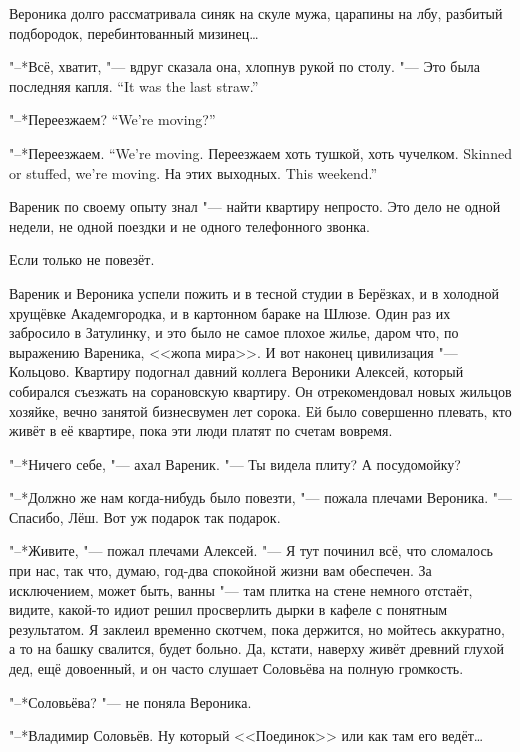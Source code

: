 Вероника долго рассматривала синяк на скуле мужа, царапины на лбу, разбитый подбородок, перебинтованный мизинец\dots{}

"--*Всё, хватит, "--- вдруг сказала она, хлопнув рукой по столу.
{"--- Это была последняя капля.}
{``It was the last straw.''}

{"--*Переезжаем?}
{``We're moving?''}

{"--*Переезжаем.}
{``We're moving.}
{Переезжаем хоть тушкой, хоть чучелком.}
{Skinned or stuffed, we're moving.}
{На этих выходных.}
{This weekend.''}

\asterism

\label{Thu_2012_06_07}

Вареник по своему опыту знал "--- найти квартиру непросто.
Это дело не одной недели, не одной поездки и не одного телефонного звонка.

Если только не повезёт.

Вареник и Вероника успели пожить и в тесной студии в Берёзках, и в холодной хрущёвке Академгородка, и в картонном бараке на Шлюзе.
Один раз их забросило в Затулинку, и это было не самое плохое жилье, даром что, по выражению Вареника, <<жопа мира>>.
И вот наконец цивилизация "--- Кольцово.
Квартиру подогнал давний коллега Вероники Алексей, который собирался съезжать на сорановскую квартиру.
Он отрекомендовал новых жильцов хозяйке, вечно занятой бизнесвумен лет сорока.
Ей было совершенно плевать, кто живёт в её квартире, пока эти люди платят по счетам вовремя.

"--*Ничего себе, "--- ахал Вареник.
"--- Ты видела плиту?
А посудомойку?

"--*Должно же нам когда-нибудь было повезти, "--- пожала плечами Вероника.
"--- Спасибо, Лёш.
Вот уж подарок так подарок.

"--*Живите, "--- пожал плечами Алексей.
"--- Я тут починил всё, что сломалось при нас, так что, думаю, год-два спокойной жизни вам обеспечен.
За исключением, может быть, ванны "--- там плитка на стене немного отстаёт, видите, какой-то идиот решил просверлить дырки в кафеле с понятным результатом.
Я заклеил временно скотчем, пока держится, но мойтесь аккуратно, а то на башку свалится, будет больно.
Да, кстати, наверху живёт древний глухой дед, ещё довоенный, и он часто слушает Соловьёва на полную громкость.

"--*Соловьёва? "--- не поняла Вероника.

"--*Владимир Соловьёв.
Ну который <<Поединок>> или как там его ведёт\dots{}

